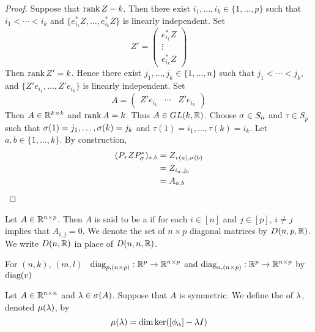 \documentclass{book}
\begin{document}
	\begin{proof}
		Suppose that $\operatorname{\text{rank}} Z - k$. Then there exist $i_1, \ldots, i_k \in \{1, \ldots, p\}$ such that $i_1 < \cdots < i_k$ and $\{	e_{i_1}^* Z, \ldots, e_{i_k}^* Z \}$ is linearly independent. Set 
		$$ Z' = 
		\begin{pmatrix}
			e_{i_1}^* Z \\
			\vdots \\
			e_{i_k}^* Z 
		\end{pmatrix}
		$$
		Then $\operatorname{\text{rank}} Z' = k$. Hence there exist $j_1, \ldots, j_k \in \{1, \ldots, n\}$ such that $j_1 < \cdots < j_k$, and $\{Z' e_{i_1}, \ldots, Z' e_{i_k} \}$ is linearly independent. Set 
		$$ A = 
		\begin{pmatrix}
			Z' e_{i_1} & \cdots & Z' e_{i_k}
		\end{pmatrix}
		$$
		Then $A \in \mathbb{R}^{k \times k}$ and $\operatorname{\text{rank}} A = k$. Thus $A \in GL(k, \mathbb{R})$. Choose $\sigma \in S_n$ and $\tau \in S_p$ such that $\sigma(1) = j_1, \ldots, \sigma(k) = j_k$ and $\tau(1) = i_1, \ldots, \tau(k) = i_k$. Let $a,b \in \{1, \ldots, k\}$. By construction, 
		\begin{align*}
			(P_{\tau} Z P^*_{\sigma})_{a, b}
			& = Z_{\tau(a), \sigma(b)} \\
			& = Z_{i_a, j_b} \\
			& = A_{a, b}
		\end{align*}
		\end{proof}

	\begin{defn} 
		Let $A \in \mathbb{R}^{n \times p}$. Then $A$ is said to be a  if for each $i \in [n]$ and $j \in [p]$, $i \neq j$ implies that $A_{i,j} = 0$. We denote the set of $n \times p$ diagonal  matrices by $D(n, p, \mathbb{R})$. We write $D(n, \mathbb{R})$ in place of $D(n, n, \mathbb{R})$.
	\end{defn}

	\begin{defn} 
		For $(n, k)$, $(m, l)$ \ $\operatorname{\text{diag}}_{p, (n \times p)} : \mathbb{R}^p \rightarrow \mathbb{R}^{n \times p}$ and $\operatorname{\text{diag}}_{n, (n \times p)} : \mathbb{R}^p \rightarrow \mathbb{R}^{n \times p}$  by $\operatorname{\text{diag}}(v)$
	\end{defn}


	\begin{defn} 
		Let $A \in \mathbb{R}^{n \times n}$ and $\lambda \in \sigma(A)$. Suppose that $A$ is symmetric. We define the  of $\lambda$, denoted $\mu(\lambda)$, by 
		$$\mu(\lambda) = \dim \ker ([\phi_{\alpha}] - \lambda I)$$
	\end{defn}
\end{document}

